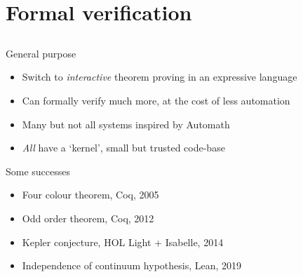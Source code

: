 \documentclass[usenames,dvipsnames,handout]{beamer}
\begin{document}
\section{Formal verification}
\subsection{}
\begin{frame}{General purpose}
  \begin{itemize}[<+->]
    \item Switch to \emph{interactive} theorem proving in an expressive language
    \item Can formally verify much more, at the cost of less automation
    \item Many but not all systems inspired by Automath
    \item \emph{All} have a `kernel', small but trusted code-base
  \end{itemize}
\end{frame}
\begin{frame}{Some successes}
  \begin{itemize}
    \item Four colour theorem, Coq, 2005
    \item Odd order theorem, Coq, 2012
    \item Kepler conjecture, HOL Light + Isabelle, 2014
    \item Independence of continuum hypothesis, Lean, 2019
  \end{itemize}
\end{frame}
\end{document}
